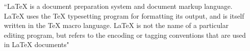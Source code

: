 \documentclass{article}
\begin{document}
\begin{flushleft}
    ``LaTeX is a document preparation system and document markup language. LaTeX uses the TeX typesetting program for formatting its output, and is itself written in the TeX macro language. LaTeX is not the name of a particular editing program, but refers to the encoding or tagging conventions that are used in LaTeX documents"
\end{flushleft}
\end{document}

